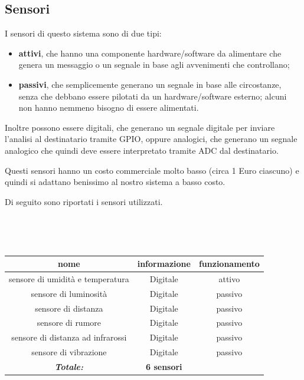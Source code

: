 \documentclass[a4paper,titlepage]{book}
\newcommand{\itema}{\begin{itemize}[noitemsep,topsep=10pt,parsep=5pt,partopsep=10pt]}
\begin{document}
\subsection{Sensori}

I sensori di questo sistema sono di due tipi:

\itema

\item \textbf{attivi}, che hanno una componente hardware/software da alimentare che genera un messaggio o un segnale in base agli avvenimenti che controllano;

\item \textbf{passivi}, che semplicemente generano un segnale in base alle circostanze, senza che debbano essere pilotati da un hardware/software esterno; alcuni non hanno nemmeno bisogno di essere alimentati.

\end{itemize}  

Inoltre possono essere digitali, che generano un segnale digitale per inviare l'analisi al destinatario tramite GPIO, oppure analogici, che generano un segnale analogico che quindi deve essere interpretato tramite ADC dal destinatario.

Questi sensori hanno un costo commerciale molto basso (circa 1 Euro ciascuno) e quindi si adattano benissimo al nostro sistema a basso costo.


Di seguito sono riportati i sensori utilizzati.

~

~


\begin{tabular}{|c  c  c|}
\hline
\multicolumn{1}{|c|}{\textbf {nome}} & \multicolumn{1}{|c|}{\textbf {informazione}} & \multicolumn{1}{c|}{\textbf {funzionamento}} \\
\hline

sensore di umidità e temperatura & Digitale	& attivo  \\
sensore di luminosità		& Digitale	& passivo \\
sensore di distanza		& Digitale	& passivo \\
sensore di rumore		& Digitale	& passivo \\
sensore di distanza ad infrarossi & Digitale	& passivo \\
sensore di vibrazione		& Digitale	& passivo \\

\hline

\textit{\textbf{Totale:}}	& \textbf{6 sensori} & \\

\hline
\end{tabular}
\end{document}
